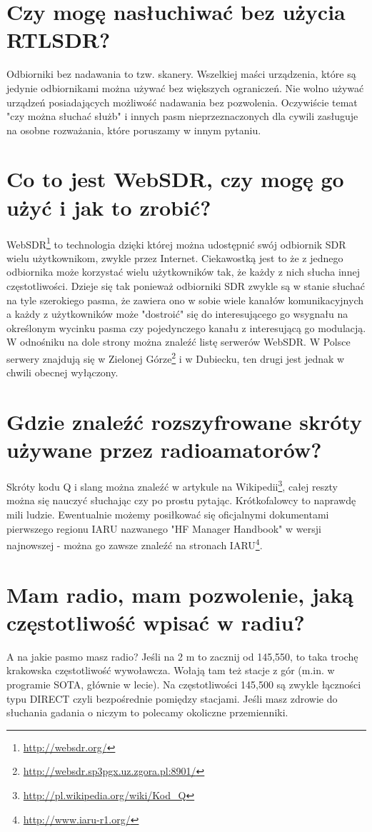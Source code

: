 \documentclass[a4paper,12pt]{article}
\begin{document}
\section{Czy mogę nasłuchiwać bez użycia RTLSDR?}
Odbiorniki bez nadawania to tzw. skanery. Wszelkiej maści urządzenia, które są jedynie odbiornikami można używać bez większych ograniczeń. Nie wolno używać urządzeń posiadających możliwość nadawania bez pozwolenia. Oczywiście temat "czy można słuchać służb" i innych pasm nieprzeznaczonych dla cywili zasługuje na osobne rozważania, które poruszamy w innym pytaniu.

\section{Co to jest WebSDR, czy mogę go użyć i jak to zrobić?}
WebSDR\footnote{\url{http://websdr.org/}} to technologia dzięki której można udostępnić swój odbiornik SDR wielu użytkownikom, zwykle przez Internet. Ciekawostką jest to że z jednego odbiornika może korzystać wielu użytkowników tak, że każdy z nich słucha innej częstotliwości. Dzieje się tak ponieważ odbiorniki SDR zwykle są w stanie słuchać na tyle szerokiego pasma, że zawiera ono w sobie wiele kanałów komunikacyjnych a każdy z użytkowników może "dostroić" się do interesującego go wsygnału na określonym wycinku pasma czy pojedynczego kanału z interesującą go modulacją. W odnośniku na dole strony można znaleźć listę serwerów WebSDR. W Polsce serwery znajdują się w Zielonej Górze\footnote{\url{http://websdr.sp3pgx.uz.zgora.pl:8901/}} i w Dubiecku, ten drugi jest jednak w chwili obecnej wyłączony.


\section{Gdzie znaleźć rozszyfrowane skróty używane przez radioamatorów?}
Skróty kodu Q i slang można znaleźć w artykule na Wikipedii\footnote{\url{http://pl.wikipedia.org/wiki/Kod_Q}}, całej reszty można się nauczyć słuchając czy po prostu pytając. Krótkofalowcy to naprawdę mili ludzie. Ewentualnie możemy posiłkować się oficjalnymi dokumentami pierwszego regionu IARU nazwanego "HF Manager Handbook" w wersji najnowszej - można go zawsze znaleźć na stronach IARU\footnote{\url{http://www.iaru-r1.org/}}.

\section{Mam radio, mam pozwolenie, jaką częstotliwość wpisać w radiu?}
A na jakie pasmo masz radio?
Jeśli na 2 m to zacznij od 145,550, to taka trochę krakowska częstotliwość wywoławcza. Wołają tam też stacje z gór (m.in. w programie SOTA, głównie w lecie). Na częstotliwości 145,500 są zwykle łączności typu DIRECT czyli bezpośrednie pomiędzy stacjami. Jeśli masz zdrowie do słuchania gadania o niczym to polecamy okoliczne przemienniki.
\end{document}
